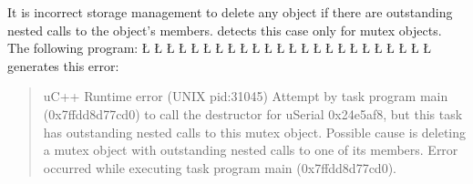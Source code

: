 \documentclass[openright,twoside]{report}
\begin{document}
It is incorrect storage management to delete any object if there are outstanding nested calls to the object's members.
\uC detects this case only for mutex objects.
The following program:
\LGinlinefalse\LGbegin\lgrinde
\L{}
\L{\LB{}}
\L{}
\L{}
\L{\LB{}}
\L{\LB{\};}}
\L{}
\L{\LB{}}
\L{}
\L{\LB{}}
\L{\LB{}}
\CE{}\L{\LB{}}
\CE{}\L{\LB{}}
\L{\LB{}}
\L{\LB{}}
\CE{}\L{\LB{}}
\L{\LB{\};}}
\endlgrinde\LGend
\LGinlinefalse\LGbegin\lgrinde
\L{}
\L{\LB{}}
\CE{}\L{\LB{\}}}
\L{}
\L{\LB{}}
\L{\LB{}}
\L{\LB{\}}}
\endlgrinde\LGend
generates this error:
\begin{quote}
\BGfont
uC++ Runtime error (UNIX pid:31045) Attempt by task program main (0x7ffdd8d77cd0) to call the destructor for uSerial 0x24e5af8, but this task has outstanding nested calls to this mutex object.
Possible cause is deleting a mutex object with outstanding nested calls to one of its members.
Error occurred while executing task program main (0x7ffdd8d77cd0).
\end{quote}
\end{document}
